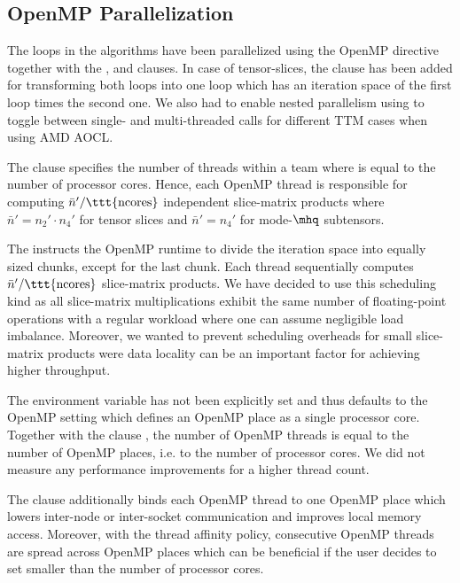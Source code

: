 \subsection{OpenMP Parallelization}
The loops in the  algorithms have been parallelized using the OpenMP directive  together with the ,  and \allowbreak{} clauses.
In case of tensor-slices, the  clause has been added for transforming both loops into one loop which has an iteration space of the first loop times the second one. 
We also had to enable nested parallelism using  to toggle between single- and multi-threaded  calls for different TTM cases when using AMD AOCL.

The  clause specifies the number of threads within a team where  is equal to the number of processor cores. 
Hence, each OpenMP thread is responsible for computing $\bar{n}' / \text{\ttt{ncores}}$ independent slice-matrix products where $\bar{n}' = n_2' \cdot n_4'$ for tensor slices and $\bar{n}' = n_4'$ for mode-$\mhq$ subtensors.

The  instructs the OpenMP runtime to divide the iteration space into equally sized chunks, except for the last chunk.
Each thread sequentially computes $ \bar{n}' / \text{\ttt{ncores}}$ slice-matrix products.
We have decided to use this scheduling kind as all slice-matrix multiplications exhibit the same number of floating-point operations with a regular workload where one can assume negligible load imbalance.
Moreover, we wanted to prevent scheduling overheads for small slice-matrix products were data locality can be an important factor for achieving higher throughput.

The  environment variable has not been explicitly set and thus defaults to the OpenMP  setting which defines an OpenMP place as a single processor core. %
Together with the clause , the number of OpenMP threads is equal to the number of OpenMP places, i.e. to the number of processor cores.
We did not measure any performance improvements for a higher thread count.

The  clause additionally binds each OpenMP thread to one OpenMP place which lowers inter-node or inter-socket communication and improves local memory access.
Moreover, with the  thread affinity policy, consecutive OpenMP threads are spread across OpenMP places which can be beneficial if the user decides to set  smaller than the number of processor cores.

